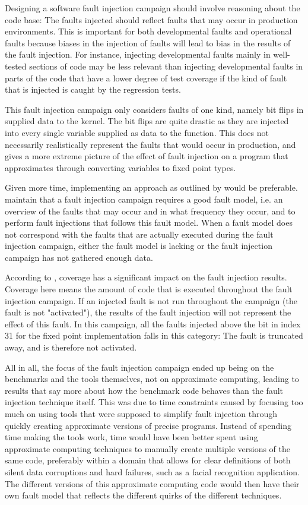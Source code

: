 Designing a software fault injection campaign should involve reasoning about the code base: The faults injected should reflect faults that may occur in production environments. This is important for both developmental faults and operational faults because biases in the injection of faults will lead to bias in the results of the fault injection. For instance, injecting developmental faults mainly in  well-tested sections of code may be less relevant than injecting developmental faults in parts of the code that have a lower degree of test coverage if the kind of fault that is injected is caught by the regression tests. 

This fault injection campaign only considers faults of one kind, namely bit flips in supplied data to the kernel. The bit flips are quite drastic as they are injected into every single variable supplied as data to the function. This does not necessarily realistically represent the faults that would occur in production, and gives a more extreme picture of the effect of fault injection on a program that approximates through converting variables to fixed point types. 

Given more time, implementing an approach as outlined by \citet{van2016finding} would be preferable. \citet{van2016finding} maintain that a fault injection campaign requires a good fault model, i.e. an overview of the faults that may occur and in what frequency they occur, and to perform fault injections that follows this fault model. When a fault model does not correspond with the faults that are actually executed during the fault injection campaign, either the fault model is lacking or the fault injection campaign has not gathered enough data. 

According to \citet{van2016finding}, coverage has a significant impact on the fault injection results. Coverage here means the amount of code that is executed throughout the fault injection campaign. If an injected fault is not run throughout the campaign (the fault is not "activated"), the results of the fault injection will not represent the effect of this fault. In this campaign, all the faults injected above the bit in index 31 for the fixed point implementation falls in this category: The fault is truncated away, and is therefore not activated. 

All in all, the focus of the fault injection campaign ended up being on the benchmarks and the tools themselves, not on approximate computing, leading to results that say more about how the benchmark code behaves than the fault injection technique itself. This was due to time constraints caused by focusing too much on using tools that were supposed to simplify fault injection through quickly creating approximate versions of precise programs. Instead of spending time making the tools work, time would have been better spent using approximate computing techniques to manually create multiple versions of the same code, preferably within a domain that allows for clear definitions of both silent data corruptions and hard failures, such as a facial recognition application. The different versions of this approximate computing code would then have their own fault model that reflects the different quirks of the different techniques. 

